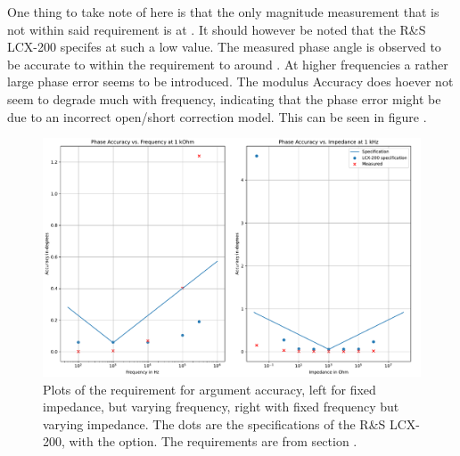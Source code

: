 One thing to take note of here is that the only magnitude measurement that is not within said requirement is at . It should however be noted that the R\&S LCX-200 specifes  at such a low value.
The measured phase angle is observed to be accurate to within the requirement to around . At higher frequencies a rather large phase error seems to be introduced. The modulus Accuracy does hoever not seem to degrade much with frequency, indicating that the phase error might be due to an incorrect open/short correction model. This can be seen in figure .

\begin{figure}[H]
    \centering
    \includegraphics[width=1\textwidth]{Sections/8_SystemVerification/Figures/SpecVTest_Phase.pdf}
    \caption{Plots of the requirement for argument accuracy, left for fixed impedance, but varying frequency, right with fixed frequency but varying impedance. The dots are the specifications of the R\&S LCX-200, with the  option. The requirements are from section .}
    \label{fig_8_ArgumentAccuracy}
\end{figure}
  

